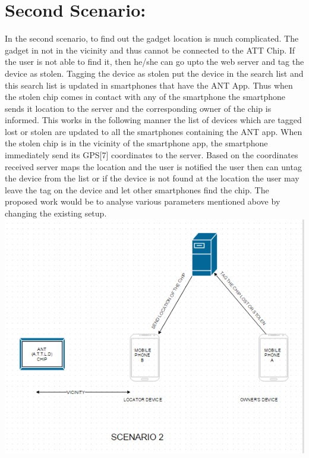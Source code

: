 \documentclass[a4paper,10pt]{report}
\begin{document}
\section{Second Scenario:}
In the second scenario, to find out the gadget location is much complicated. The gadget in not in the vicinity and thus cannot be connected to the ATT Chip. If the user is not able to find it, then he/she can go upto the web server and tag the device as stolen. Tagging the device as stolen put the device in the search list and this search list is updated in smartphones that have the ANT App. Thus when the stolen chip comes in contact with any of the smartphone the smartphone sends it location to the server and the corresponding owner of the chip is informed. This works in the following manner the list of devices which are tagged lost or stolen are updated to all the smartphones containing the ANT app. When the stolen chip is in the vicinity of the smartphone app, the smartphone immediately send its GPS[7] coordinates to the server. Based on the coordinates received server maps the location and the user is notified the user then can untag the device from the list or if the device is not found at the location the user may leave the tag on the device and let other smartphones find the chip. The proposed work would be to analyse various parameters mentioned above by changing the existing setup.\\[0.3in]
\includegraphics[scale=0.7]{images/sceneb}
\newpage
{}
\end{document}
